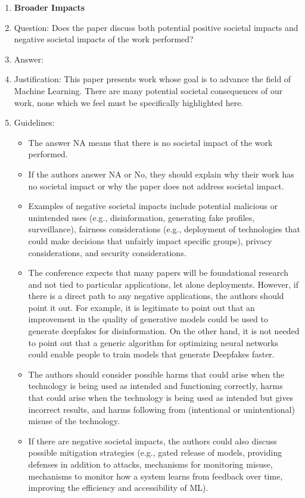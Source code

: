 \documentclass{article}
\theoremstyle{plain}
\theoremstyle{definition}
\theoremstyle{remark}
\begin{document}
\begin{enumerate}
\item {\bf Broader Impacts}
    \item[] Question: Does the paper discuss both potential positive societal impacts and negative societal impacts of the work performed?
    \item[] Answer: \answerNA{} %
    \item[] Justification: This paper presents work whose goal is to advance the field of Machine Learning. There are many potential societal consequences of our work, none which we feel must be specifically highlighted here.
    \item[] Guidelines:
    \begin{itemize}
        \item The answer NA means that there is no societal impact of the work performed.
        \item If the authors answer NA or No, they should explain why their work has no societal impact or why the paper does not address societal impact.
        \item Examples of negative societal impacts include potential malicious or unintended uses (e.g., disinformation, generating fake profiles, surveillance), fairness considerations (e.g., deployment of technologies that could make decisions that unfairly impact specific groups), privacy considerations, and security considerations.
        \item The conference expects that many papers will be foundational research and not tied to particular applications, let alone deployments. However, if there is a direct path to any negative applications, the authors should point it out. For example, it is legitimate to point out that an improvement in the quality of generative models could be used to generate deepfakes for disinformation. On the other hand, it is not needed to point out that a generic algorithm for optimizing neural networks could enable people to train models that generate Deepfakes faster.
        \item The authors should consider possible harms that could arise when the technology is being used as intended and functioning correctly, harms that could arise when the technology is being used as intended but gives incorrect results, and harms following from (intentional or unintentional) misuse of the technology.
        \item If there are negative societal impacts, the authors could also discuss possible mitigation strategies (e.g., gated release of models, providing defenses in addition to attacks, mechanisms for monitoring misuse, mechanisms to monitor how a system learns from feedback over time, improving the efficiency and accessibility of ML).
    \end{itemize}
    

\end{enumerate}
\end{document}

